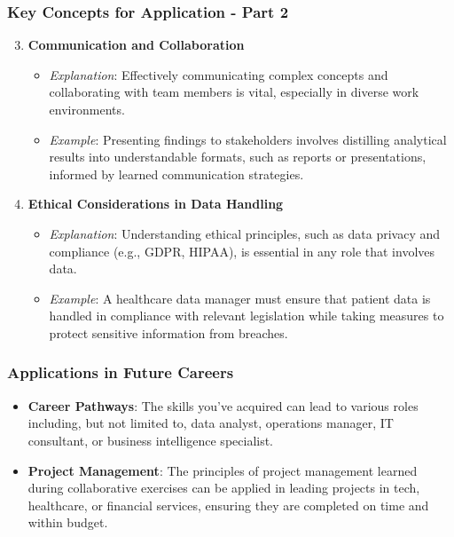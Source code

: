 \documentclass[aspectratio=169]{beamer}
\begin{document}
\begin{frame}[fragile]
    \frametitle{Key Concepts for Application - Part 2}
    \begin{enumerate}
        \setcounter{enumi}{2}
        \item \textbf{Communication and Collaboration}
        \begin{itemize}
            \item \textit{Explanation}: Effectively communicating complex concepts and collaborating with team members is vital, especially in diverse work environments.
            \item \textit{Example}: Presenting findings to stakeholders involves distilling analytical results into understandable formats, such as reports or presentations, informed by learned communication strategies.
        \end{itemize}

        \item \textbf{Ethical Considerations in Data Handling}
        \begin{itemize}
            \item \textit{Explanation}: Understanding ethical principles, such as data privacy and compliance (e.g., GDPR, HIPAA), is essential in any role that involves data.
            \item \textit{Example}: A healthcare data manager must ensure that patient data is handled in compliance with relevant legislation while taking measures to protect sensitive information from breaches.
        \end{itemize}
    \end{enumerate}
\end{frame}

\begin{frame}[fragile]
    \frametitle{Applications in Future Careers}
    \begin{itemize}
        \item \textbf{Career Pathways}: The skills you’ve acquired can lead to various roles including, but not limited to, data analyst, operations manager, IT consultant, or business intelligence specialist.
        \item \textbf{Project Management}: The principles of project management learned during collaborative exercises can be applied in leading projects in tech, healthcare, or financial services, ensuring they are completed on time and within budget.
    \end{itemize}
\end{frame}
\end{document}
